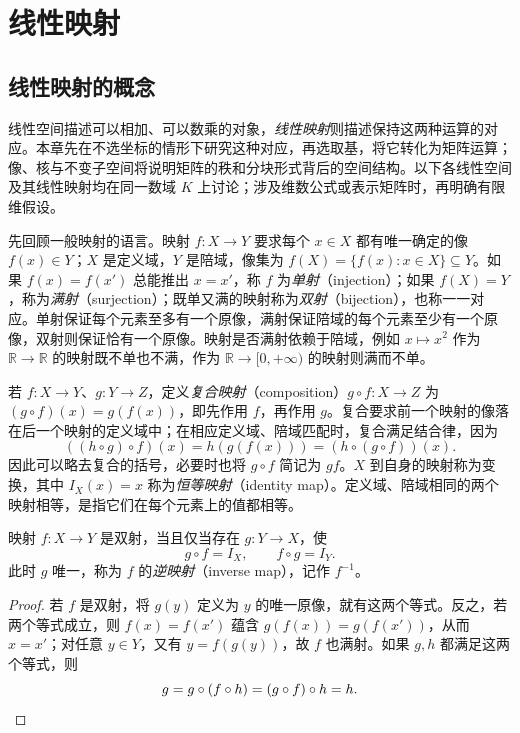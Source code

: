 \setcounter{chapter}{3} %
\chapter{线性映射}
\label{chap:linear-maps}

\section{线性映射的概念}
\label{sec:linear-map-concept}

线性空间描述可以相加、可以数乘的对象，\emph{线性映射}则描述保持这两种运算的对应。本章先在不选坐标的情形下研究这种对应，再选取基，将它转化为矩阵运算；像、核与不变子空间将说明矩阵的秩和分块形式背后的空间结构。以下各线性空间及其线性映射均在同一数域 $K$ 上讨论；涉及维数公式或表示矩阵时，再明确有限维假设。

先回顾一般映射的语言。映射 $f:X\to Y$ 要求每个 $x\in X$ 都有唯一确定的像 $f(x)\in Y$；$X$ 是定义域，$Y$ 是陪域，像集为 $f(X)=\{f(x):x\in X\}\subseteq Y$。如果 $f(x)=f(x')$ 总能推出 $x=x'$，称 $f$ 为\emph{单射}（injection）；如果 $f(X)=Y$，称为\emph{满射}（surjection）；既单又满的映射称为\emph{双射}（bijection），也称一一对应。单射保证每个元素至多有一个原像，满射保证陪域的每个元素至少有一个原像，双射则保证恰有一个原像。映射是否满射依赖于陪域，例如 $x\mapsto x^2$ 作为 $\mathbb R\to\mathbb R$ 的映射既不单也不满，作为 $\mathbb R\to[0,+\infty)$ 的映射则满而不单。

若 $f:X\to Y$、$g:Y\to Z$，定义\emph{复合映射}（composition）$g\circ f:X\to Z$ 为 $(g\circ f)(x)=g(f(x))$，即先作用 $f$，再作用 $g$。复合要求前一个映射的像落在后一个映射的定义域中；在相应定义域、陪域匹配时，复合满足结合律，因为
\[
    ((h\circ g)\circ f)(x)=h(g(f(x)))
    =(h\circ(g\circ f))(x).
\]
因此可以略去复合的括号，必要时也将 $g\circ f$ 简记为 $gf$。$X$ 到自身的映射称为变换，其中 $I_X(x)=x$ 称为\emph{恒等映射}（identity map）。定义域、陪域相同的两个映射相等，是指它们在每个元素上的值都相等。

\begin{proposition}
\label{prop:map-two-sided-inverse}
映射 $f:X\to Y$ 是双射，当且仅当存在 $g:Y\to X$，使
\[
    g\circ f=I_X,\qquad f\circ g=I_Y.
\]
此时 $g$ 唯一，称为 $f$ 的\emph{逆映射}（inverse map），记作 $f^{-1}$。
\end{proposition}

\begin{proof}
若 $f$ 是双射，将 $g(y)$ 定义为 $y$ 的唯一原像，就有这两个等式。反之，若两个等式成立，则 $f(x)=f(x')$ 蕴含 $g(f(x))=g(f(x'))$，从而 $x=x'$；对任意 $y\in Y$，又有 $y=f(g(y))$，故 $f$ 也满射。如果 $g,h$ 都满足这两个等式，则
\[
    g=g\circ(f\circ h)=(g\circ f)\circ h=h.\qedhere
\]
\end{proof}

